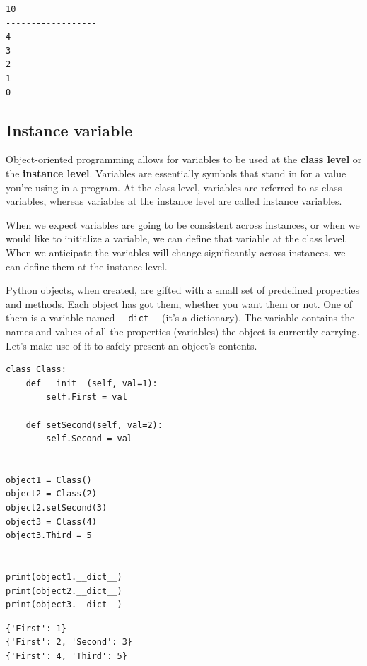 \documentclass[11pt]{article}
\begin{document}
\begin{verbatim}
10
------------------
4
3
2
1
0
\end{verbatim}

\subsection{Instance variable}
\label{sec:org889253c}
Object-oriented programming allows for variables to be used at the
\textbf{class level} or the \textbf{instance level}. Variables are essentially
symbols that stand in for a value you’re using in a program. At the
class level, variables are referred to as class variables, whereas
variables at the instance level are called instance variables.

When we expect variables are going to be consistent across instances,
or when we would like to initialize a variable, we can define that
variable at the class level. When we anticipate the variables will
change significantly across instances, we can define them at the
instance level.

Python objects, when created, are gifted with a small set of
predefined properties and methods. Each object has got them, whether
you want them or not. One of them is a variable named \texttt{\_\_dict\_\_} (it’s a
dictionary).  The variable contains the names and values of all the
properties (variables) the object is currently carrying. Let’s make
use of it to safely present an object’s contents.

\begin{verbatim}
class Class:
	def __init__(self, val=1):
		self.First = val

	def setSecond(self, val=2):
		self.Second = val


object1 = Class()
object2 = Class(2)
object2.setSecond(3)
object3 = Class(4)
object3.Third = 5


print(object1.__dict__)
print(object2.__dict__)
print(object3.__dict__)
\end{verbatim}

\begin{verbatim}
{'First': 1}
{'First': 2, 'Second': 3}
{'First': 4, 'Third': 5}
\end{verbatim}
\end{document}
